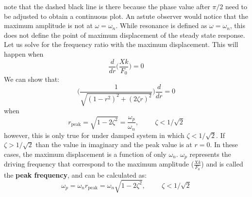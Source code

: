 \documentclass[12pt,letter]{article}
\numberwithin{ex}{section} %
\numberwithin{re}{section} %
\begin{document}
			note that the dashed black line is there because the phase value after $\pi/2$ need to be adjusted to obtain a continuous plot. An astute observer would notice that the maximum amplitude is not at $\omega = \omega_n$. While resonance is defined as $\omega = \omega_n$, this does not define the point of maximum displacement of the steady state response. Let us solve for the frequency ratio with the maximum displacement. This will happen when
			\begin{equation}
				\frac{d}{dr}\Bigg(\frac{Xk}{F_0} \Bigg)= 0
			\end{equation}				
			We can show that:
			\begin{equation}
			\Bigg(\frac{1}{\sqrt{(1-r^2)^2+(2\zeta r)^2}}\Bigg)	\frac{d}{dr} =0
			\end{equation}	
			when 
			\begin{equation}
			r_{\text{peak}} = \sqrt{1-2 \zeta^2}= \frac{\omega_p}{\omega_n}, \hspace{1cm} \zeta<1/\sqrt{2} 
			\end{equation}				
			however, this is only true for under damped system in which $\zeta<1/\sqrt{2}$. If $\zeta>1/\sqrt{2}$ than the value in imaginary and the peak value is at $r=0$. In these cases, the maximum displacement is a function of only $\omega_n$. $\omega_p$ represents the driving frequency that correspond to the maximum amplitude ($\frac{Xk}{F_0}$) and is called the \textbf{peak frequency}, and can be calculated as:
			\begin{equation}
			\omega_p = \omega_n r_{\text{peak}} = \omega_n \sqrt{1-2 \zeta^2}, \hspace{1cm} \zeta<1/\sqrt{2} 
			\end{equation}				
			
			
			
\end{document}
